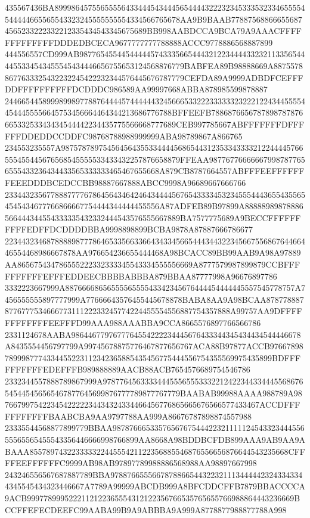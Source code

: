 435567436BA899986457556555564334445434445654444322232345333532334655554544444665565543323245555555554334566765678AA9B9BAAB778875688666556874565233222332212335434543345675689BB998AABDCCA9BCA79A9AAACFFFFFFFFFFFFFDDDEDBCECA9677777777788888ACCC9778886568887899
444556557CD999AB9877654554454444457433356654443212234444332321133565444455334543455545434446656755653124568876779BABFEA89B98888669A88755788677633325432232245422232344576445676787779CEFDA89A9999ADBDFCEFFFDDFFFFFFFFFFDCDDDC986589AA99997668ABBA878985599878887
2446654458999899897788764444574444443245666533222333333232221224344555544544455556645753456664464344213686776788BFFEEFB788687665678789878787666533253343434544442234435775566668777689CEB997785667ABFFFFFFFDFFFFFFDDEDDCCDDFC98768788988999999ABA98789867A866765
234553235557A9875787897545645643553344445686544312353343333212244445766555455445676568545555533433432257876658879FFEAA987767766666679987877656555433236434433565333333465467655668A879CB8787664557ABFFFEEFFFFFFFEEEDDDBCEDCCBB98887667888ABCC9998A96689667666766
2334432356778887777678645643464246434444567654333345323455544436554355654545434677766866667754444344444455556A87ADFEB89B97899A88888989878886566444344554333335432332444543576555667889BA7577775689A9BECCFFFFFFFFFFEDFFDCDDDDBBA9998898899BCBA9878A87887666786677
22344323468788889877786465335663366434334566544434432234566755686764466446554468986667878AA976654236655444468A98BCACC89BB99AAB9A98A97889AA865675434786555222332333345543334555556669A8777579987899879CCBFFFFFFFFFFEFFFEDDEECBBBBABBBA879BBAA87777998A96676897786
3332223667999A8876666865655556555543342345676444454444445557545778757A7456555555897777999A77666643576455445678878BABA8AA9A98BCAA878778887877677753466677311122233245774224455554556887754357888A99757AA9DFFFFFFFFFFFFEEFFFD99AAA988AAABBA9CCA8665576897766566786
2331124678AABA9864467797677764554222234445676433344345434434544446678A8435554456797799A99745678875776467877656767ACA88B97877ACCB976678987899987774334455223112342365885435456775444556754355569975435899BDFFFFFFFFFFEDEFFFB989888889AACB88ACB7654576689754546786
2332344557888789867999A978776456333344455565553332212422344334445568676545445456565467877645699876777789877767779BAABAB99988AAAA988789A987667997542234542222234434324334466456776865665676566577433467ACCDFFFFFFFFFFFBAABCBA9AA9797788AA999A86676787898874557988
23335544568877899779BBAA987876665335765676754442232111112454332344455655565565455543356446666998766899AA8668A98BDDBCFDB899AAA9AB9AA9ABAAA85578974322333332244555421122356885546876556656876644543235668CFFFFEEFFFFFFC9999AB98AB97897789988886568988AA98897667998
243246556567687887789BBA97887665556678788665443223211134444423243343344345545434323446667A7789A99999ABCDB999A8BFCDDCFFB7879BBACCCCA9ACB9997789995222112122365554312122356766535765655766988864443236669BCCFFEFECDEEFC99AABA99B9A9ABBBA9A999A8778877988877788A998
